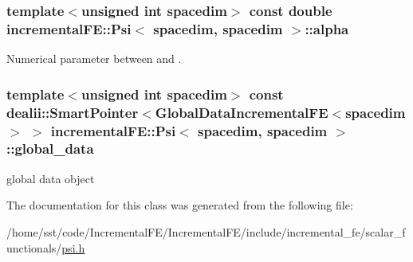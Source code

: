 \subsubsection[{\texorpdfstring{alpha}{alpha}}]{\setlength{\rightskip}{0pt plus 5cm}template$<$unsigned int spacedim$>$ const double {\bf incremental\+F\+E\+::\+Psi}$<$ spacedim, spacedim $>$\+::alpha\hspace{0.3cm}{\ttfamily [private]}}\hypertarget{classincremental_f_e_1_1_psi_3_01spacedim_00_01spacedim_01_4_af7b8227188dbdd6ada35b9445d96c79d}{}\label{classincremental_f_e_1_1_psi_3_01spacedim_00_01spacedim_01_4_af7b8227188dbdd6ada35b9445d96c79d}
Numerical parameter between {} and {}. 
\subsubsection[{\texorpdfstring{global\+\_\+data}{global_data}}]{\setlength{\rightskip}{0pt plus 5cm}template$<$unsigned int spacedim$>$ const dealii\+::\+Smart\+Pointer$<${\bf Global\+Data\+Incremental\+FE}$<$spacedim$>$ $>$ {\bf incremental\+F\+E\+::\+Psi}$<$ spacedim, spacedim $>$\+::global\+\_\+data\hspace{0.3cm}{\ttfamily [private]}}\hypertarget{classincremental_f_e_1_1_psi_3_01spacedim_00_01spacedim_01_4_abf0a4804877fd7cc9bd1b90e52760ba9}{}\label{classincremental_f_e_1_1_psi_3_01spacedim_00_01spacedim_01_4_abf0a4804877fd7cc9bd1b90e52760ba9}
global data object 

The documentation for this class was generated from the following file\+:\begin{DoxyCompactItemize}
\item 
/home/sst/code/\+Incremental\+F\+E/\+Incremental\+F\+E/include/incremental\+\_\+fe/scalar\+\_\+functionals/\hyperlink{psi_8h}{psi.\+h}\end{DoxyCompactItemize}
